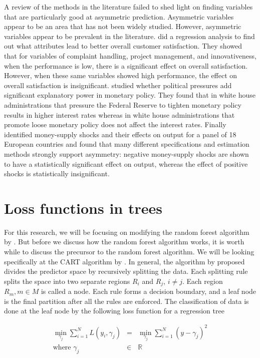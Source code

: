 \documentclass[twoside,11pt]{article}
\begin{document}
A review of the methods in the literature failed to shed light on finding variables that are particularly good at asymmetric prediction. Asymmetric variables appear to be an area that has not been widely studied. However, asymmetric variables appear to be prevalent in the literature. \citet{Matzler04} did a regression analysis to find out what attributes lead to better overall customer satisfaction. They showed that for variables of complaint handling, project management, and innovativeness, when the performance is low, there is a significant effect on overall satisfaction. However, when these same variables showed high performance, the effect on overall satisfaction is insignificant. \citet{Froyen97} studied whether political pressures add significant explanatory power in monetary policy. They found that in white house administrations that pressure the Federal Reserve to tighten monetary policy results in higher interest rates whereas in white house administrations that promote loose monetary policy does not affect the interest rates. Finally \citet{Karras97} identified money-supply shocks and their effects on output for a panel of 18 European countries and found that many different specifications and estimation methods strongly support asymmetry: negative money-supply shocks are shown to have a statistically significant effect on output, whereas the effect of positive shocks is statistically insignificant. 

\section{Loss functions in trees}
For this research, we will be focusing on modifying the random forest algorithm by \citet{Breiman01}. But before we discuss how the random forest algorithm works, it is worth while to discuss the precursor to the random forest algorithm. We will be looking specifically at the CART algorithm by \citet{Breiman84}. In general, the algorithm by \citet{Breiman84} proposed divides the predictor space by recursively splitting the data. Each splitting rule splits the space into two separate regions $R_i$ and $R_j$, $i \neq j$. Each region $R_m,m \in M$ is called a node. Each rule forms a decision boundary, and a leaf node is the final partition after all the rules are enforced. The classification of data is done at the leaf node by the following loss function for a regression tree

\begin{equation}
	\begin{array}{rcl}
		\min_{\gamma_j} \sum_{i=1}^N L(y_i,\gamma_j) & = &  \min_{\gamma_j} \sum_{i=1}^N (y-\gamma_j)^2 \\
	\mbox{where }	\gamma_j &\in & \mathbb{R}	
	\end{array}
\end{equation}
\end{document}
